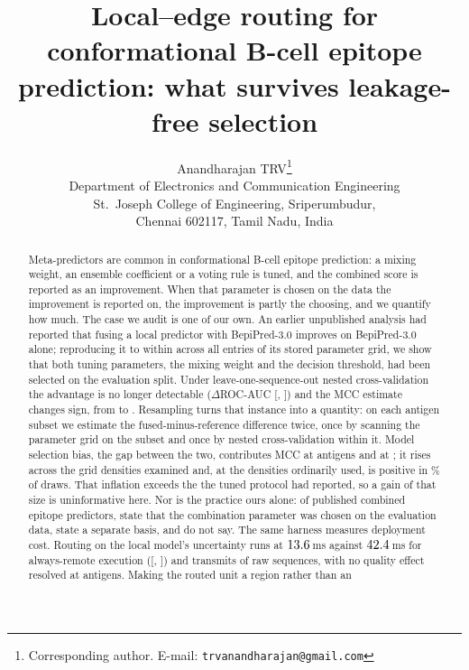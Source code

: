 \documentclass[11pt,a4paper]{article}
\title{\bfseries Local--edge routing for conformational B-cell epitope
prediction: what survives leakage-free selection}
\author{%
  Anandharajan TRV\thanks{Corresponding author.
  E-mail: \texttt{trvanandharajan@gmail.com}}\\[2pt]
  \normalsize Department of Electronics and Communication Engineering\\
  \normalsize St.\ Joseph College of Engineering, Sriperumbudur,\\
  \normalsize Chennai 602117, Tamil Nadu, India
}
\date{}
\begin{document}
\maketitle

\begin{abstract}
\noindent
Meta-predictors are common in conformational B-cell epitope prediction: a
mixing weight, an ensemble coefficient or a voting rule is tuned, and the
combined score is reported as an improvement. When that parameter is chosen on
the data the improvement is reported on, the improvement is partly the
choosing, and we quantify how much. The case we audit is one of our own. An
earlier unpublished analysis had reported that fusing a local predictor with
BepiPred-3.0 improves on BepiPred-3.0 alone; reproducing it to within
\TunedBpThreeReplicationMaxDiff{} across all \TunedBpThreeReplicationRows{}
entries of its stored parameter grid, we show that both tuning parameters, the mixing
weight and the decision threshold, had been selected on the evaluation split.
Under leave-one-sequence-out nested cross-validation the advantage is no longer
detectable (\(\Delta\)ROC-AUC \NestedBpThreeDeltaAuc{}
[\NestedBpThreeDeltaAucLo{}, \NestedBpThreeDeltaAucHi{}]) and the MCC estimate
changes sign, from \TunedBpThreeDeltaMcc{} to \NestedBpThreeDeltaMcc{}.
Resampling turns that instance into a quantity: on each antigen subset we
estimate the fused-minus-reference difference twice, once by scanning the
parameter grid on the subset and once by nested cross-validation within it. Model selection bias, the gap between the two, contributes
\BiasAtSmallestN{} MCC at \BiasSmallestN{} antigens and \BiasAtLargestN{} at
\BiasLargestN{}; it rises across the grid densities examined and, at the
densities ordinarily used, is positive in \BiasPositiveShareLargestN{}\% of
draws.
That inflation exceeds the \TunedBpThreeDeltaMcc{} the tuned protocol had
reported, so a gain of that size is uninformative here. Nor is the practice
ours alone: of \SurveyAssessed{} published combined epitope predictors,
\SurveyLeakage{} state that the combination parameter was chosen on the
evaluation data, \SurveyClean{} state a separate basis, and
\SurveyUnreported{} do not say. The same harness measures deployment cost. Routing on the local model's
uncertainty runs at \(13.6{}\,\)ms against
\(42.4{}\,\)ms for always-remote execution
([\ADAsVsEoLatencyLo{}, \ADAsVsEoLatencyHi{}]) and transmits
\AAdaptiveSplitRawShare{} of raw sequences, with no quality effect resolved at
\AntigenCount{} antigens. Making the routed unit a region rather than an

\end{abstract}
\end{document}
